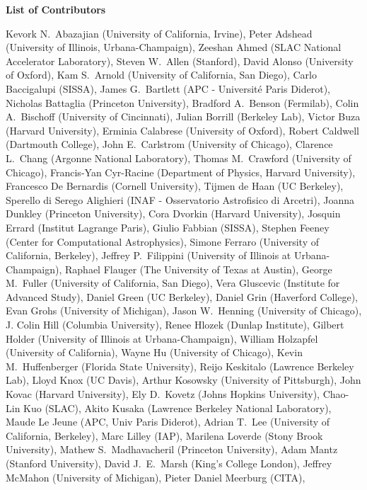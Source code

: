 \begin{center}
\textbf{List of Contributors}
\end{center}
Kevork N.~Abazajian (University of California, Irvine),
Peter Adshead (University of Illinois, Urbana-Champaign),
Zeeshan Ahmed (SLAC National Accelerator Laboratory),
Steven W.~Allen (Stanford),
David Alonso (University of Oxford),
Kam S.~Arnold (University of California, San Diego),
Carlo Baccigalupi (SISSA),
James G.~Bartlett (APC - Université Paris Diderot),
Nicholas Battaglia (Princeton University),
Bradford A.~Benson (Fermilab),
Colin A.~Bischoff (University of Cincinnati),
Julian Borrill (Berkeley Lab),
Victor Buza (Harvard University),
Erminia Calabrese (University of Oxford),
Robert Caldwell (Dartmouth College),
John E.~Carlstrom (University of Chicago),
Clarence L.~Chang (Argonne National Laboratory),
Thomas M.~Crawford (University of Chicago),
Francis-Yan Cyr-Racine (Department of Physics, Harvard University),
Francesco De Bernardis (Cornell University),
Tijmen de Haan (UC Berkeley),
Sperello di Serego Alighieri (INAF - Osservatorio Astrofisico di Arcetri),
Joanna Dunkley (Princeton University),
Cora Dvorkin (Harvard University),
Josquin Errard (Institut Lagrange Paris),
Giulio Fabbian (SISSA),
Stephen Feeney (Center for Computational Astrophysics),
Simone Ferraro (University of California, Berkeley),
Jeffrey P.~Filippini (University of Illinois at Urbana-Champaign),
Raphael Flauger (The University of Texas at Austin),
George M.~Fuller (University of California, San Diego),
Vera Gluscevic (Institute for Advanced Study),
Daniel Green (UC Berkeley),
Daniel Grin (Haverford College),
Evan Grohs (University of Michigan),
Jason W.~Henning (University of Chicago),
J. Colin Hill (Columbia University),
Renee Hlozek (Dunlap Institute),
Gilbert Holder (University of Illinois at Urbana-Champaign),
William Holzapfel (University of California),
Wayne Hu (University of Chicago),
Kevin M.~Huffenberger (Florida State University),
Reijo Keskitalo (Lawrence Berkeley Lab),
Lloyd Knox (UC Davis),
Arthur Kosowsky (University of Pittsburgh),
John Kovac (Harvard University),
Ely D.~Kovetz (Johns Hopkins University),
Chao-Lin Kuo (SLAC),
Akito Kusaka (Lawrence Berkeley National Laboratory),
Maude Le Jeune (APC, Univ Paris Diderot),
Adrian T.~Lee (University of California, Berkeley),
Marc Lilley (IAP),
Marilena Loverde (Stony Brook University),
Mathew S.~Madhavacheril (Princeton University),
Adam Mantz (Stanford University),
David J.~E.~Marsh (King's College London),
Jeffrey McMahon (University of Michigan),
Pieter Daniel Meerburg (CITA),
